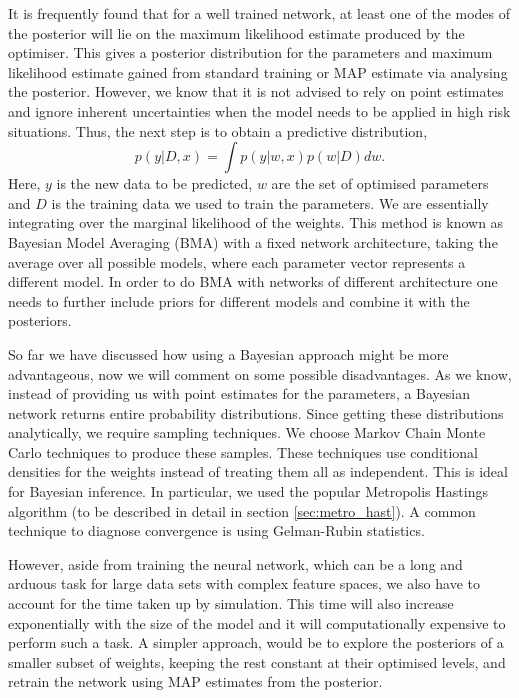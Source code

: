 \documentclass[review]{siamart190516}
\begin{document}
It is frequently found that for a well trained network, at least one of the modes of the posterior will lie on the maximum likelihood estimate produced by the optimiser. 
\newline 
This gives a posterior distribution for the parameters and maximum likelihood estimate gained from standard training or MAP estimate via analysing the posterior. However, we know that it is not advised to rely on point estimates and ignore inherent uncertainties when the model needs to be applied in high risk situations. Thus, the next step is to obtain a predictive distribution,
\begin{equation}
     p(y|D,x) = \int p(y|w,x) p(w|D) dw.
\end{equation}
Here, $y$ is the new data to be predicted, $w$ are the set of optimised parameters and $D$ is the training data we used to train the parameters. We are essentially integrating over the marginal likelihood of the weights. This method is known as Bayesian Model Averaging (BMA) with a fixed network architecture, taking the average over all possible models, where each parameter vector represents a different model. In order to do BMA with networks of different architecture one needs to further include priors for different models and combine it with the posteriors.

So far we have discussed how using a Bayesian approach might be more advantageous, now we will comment on some possible disadvantages. As we know, instead of providing us with point estimates for the parameters, a Bayesian network returns entire probability distributions. Since getting these distributions analytically, we require sampling techniques. We choose Markov Chain Monte Carlo techniques to produce these samples. These techniques use conditional densities for the weights instead of treating them all as independent. This is ideal for Bayesian inference. In particular, we used the popular Metropolis Hastings algorithm (to be described in detail in section \ref{sec:metro_hast}). A common technique to diagnose convergence is using Gelman-Rubin statistics.

However, aside from training the neural network, which can be a long and arduous task for large data sets with complex feature spaces, we also have to account for the time taken up by simulation. This time will also increase exponentially with the size of the model and it will computationally expensive to perform such a task. 
A simpler approach, would be to explore the posteriors of a smaller subset of weights, keeping the rest constant at their optimised levels, and retrain the network using MAP estimates from the posterior.
\end{document}

